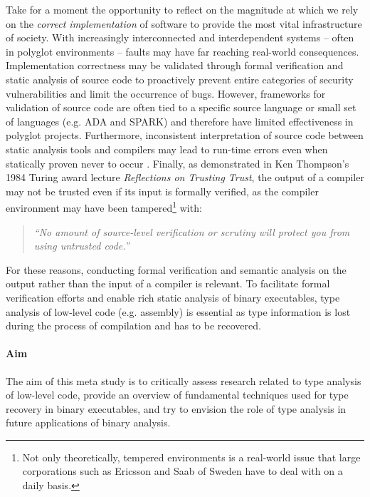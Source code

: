 \documentclass[10pt, a4paper, sigplan, authordraft]{acmart}
\begin{document}
Take for a moment the opportunity to reflect on the magnitude at which we rely on the \textit{correct implementation} of software to provide the most vital infrastructure of society. With increasingly interconnected and interdependent systems -- often in polyglot environments -- faults may have far reaching real-world consequences. Implementation correctness may be validated through formal verification and static analysis of source code to proactively prevent entire categories of security vulnerabilities and limit the occurrence of bugs. However, frameworks for validation of source code are often tied to a specific source language or small set of languages (e.g. ADA and SPARK) and therefore have limited effectiveness in polyglot projects. Furthermore, inconsistent interpretation of source code between static analysis tools and compilers may lead to run-time errors even when statically proven never to occur \cite{ada_static_analysis_and_compiler_inconsistencies}. Finally, as demonstrated in Ken Thompson's 1984 Turing award lecture \textit{Reflections on Trusting Trust}, the output of a compiler may not be trusted even if its input is formally verified, as the compiler environment may have been tampered\footnote{Not only theoretically, tempered environments is a real-world issue that large corporations such as Ericsson and Saab of Sweden have to deal with on a daily basis.} with:

\begin{quote}
	\textit{``No amount of source-level verification or scrutiny will protect you from using untrusted code.''} \cite{trusting_trust}
\end{quote}

For these reasons, conducting formal verification and semantic analysis on the output rather than the input of a compiler is relevant. To facilitate formal verification efforts and enable rich static analysis of binary executables, type analysis of low-level code (e.g. assembly) is essential as type information is lost during the process of compilation and has to be recovered.

\paragraph{Aim} The aim of this meta study is to critically assess research related to type analysis of low-level code, provide an overview of fundamental techniques used for type recovery in binary executables, and try to envision the role of type analysis in future applications of binary analysis.
\end{document}

